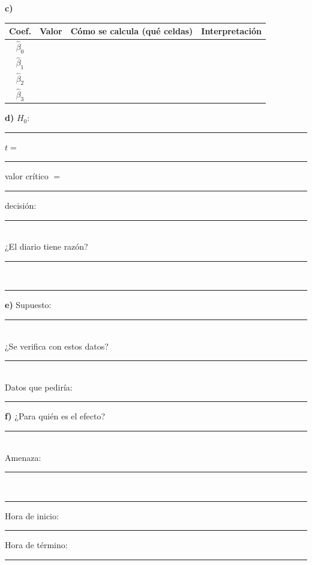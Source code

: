 \documentclass[11pt,a4paper]{article}
\begin{document}
\medskip
\noindent\textbf{c)}
\begin{center}
\renewcommand{\arraystretch}{1.9}
\begin{tabular}{|c|c|p{4.2cm}|p{7.2cm}|}\hline
Coef. & Valor & Cómo se calcula (qué celdas) & Interpretación\\\hline
$\hat\beta_0$ & & & \\\hline
$\hat\beta_1$ & & & \\\hline
$\hat\beta_2$ & & & \\\hline
$\hat\beta_3$ & & & \\\hline
\end{tabular}
\end{center}

\noindent\textbf{d)} $H_0$: \rule{3cm}{0.4pt} \quad $t=$ \rule{3cm}{0.4pt} \quad valor crítico $=$ \rule{2cm}{0.4pt} \quad decisión: \rule{2.5cm}{0.4pt}\\[8pt]
¿El diario tiene razón? \rule{12cm}{0.4pt}\\[8pt]
\rule{15.4cm}{0.4pt}

\medskip
\noindent\textbf{e)} Supuesto: \rule{13.3cm}{0.4pt}\\[8pt]
¿Se verifica con estos datos? \rule{11.2cm}{0.4pt}\\[8pt]
Datos que pediría: \rule{12.6cm}{0.4pt}

\medskip
\noindent\textbf{f)} ¿Para quién es el efecto? \rule{11.6cm}{0.4pt}\\[8pt]
Amenaza: \rule{13.7cm}{0.4pt}\\[8pt]
\rule{15.4cm}{0.4pt}

\vfill
\noindent\small Hora de inicio: \rule{2cm}{0.4pt} \quad Hora de término: \rule{2cm}{0.4pt}
\end{document}
